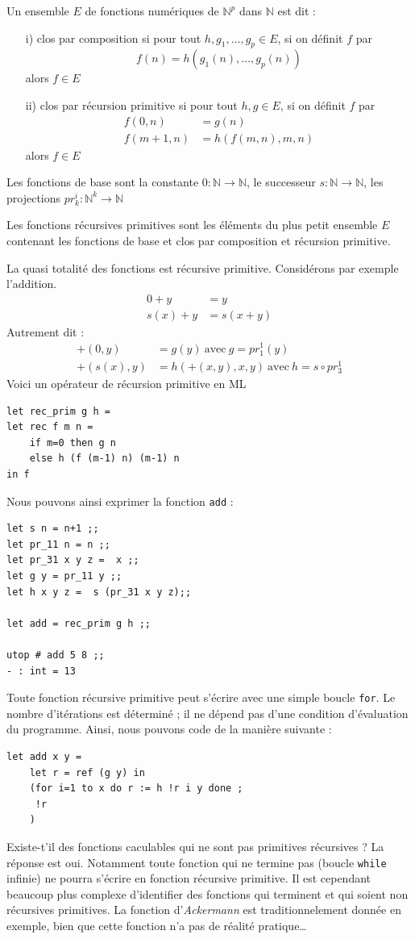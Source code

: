 \documentclass[11pt]{book}
\begin{document}
Un ensemble $E$ de fonctions numériques de $\mathbb{N}^p$ dans $\mathbb{N}$ est dit :
\begin{itemize}
	\item [i)] clos par composition si pour tout $h, g_1, \dots,g_p \in E$, si on définit $f$ par
	 $$f(n)=h(g_1(n), \dots, g_p(n))$$
	alors $f \in E$
	\item [ii)] clos par récursion primitive si pour tout $h,g \in E$, si on définit $f$ par
	\begin{align*}
	f(0,n) &= g(n) \\
	f(m+1, n) &= h(f(m,n),m,n)
\end{align*}
alors $f \in E$
\end{itemize}
Les fonctions de base sont la constante $0 : \mathbb{N} \rightarrow \mathbb{N}$, le successeur 
$s :\mathbb{N} \rightarrow \mathbb{N}$, les projections $pr_k^i : \mathbb{N}^k \rightarrow \mathbb{N}$

Les fonctions récursives primitives sont les éléments du plus petit ensemble $E$ contenant les
fonctions de base et clos par composition et récursion primitive.

La quasi totalité des fonctions est récursive primitive. Considérons par exemple l'addition.
\begin{align*}
	0 + y &= y  \\
	s(x) + y &= s(x+y) 
\end{align*}
Autrement dit :
\begin{align*}
	+ (0, y) &=  g(y)\ \text{avec}\ g=pr_1^1 (y) \\
	+ (s(x), y) &= h (+(x, y), x, y)\ \text{avec}\ h=s \circ  pr_3^1
\end{align*}
Voici un opérateur de récursion primitive en ML
\begin{Verbatim}
let rec_prim g h = 
let rec f m n = 
	if m=0 then g n 
	else h (f (m-1) n) (m-1) n
in f 
\end{Verbatim}
Nous pouvons ainsi exprimer la fonction \verb+add+ :
\begin{Verbatim}
let s n = n+1 ;;
let pr_11 n = n ;;
let pr_31 x y z =  x ;;
let g y = pr_11 y ;;
let h x y z =  s (pr_31 x y z);;

let add = rec_prim g h ;;

utop # add 5 8 ;;
- : int = 13
\end{Verbatim}
Toute fonction récursive primitive peut s'écrire avec une simple boucle \verb+for+.
Le nombre d'itérations est déterminé ; il ne dépend pas d'une condition d'évaluation du programme.
Ainsi, nous pouvons code de la manière suivante :
\begin{Verbatim}
let add x y =
	let r = ref (g y) in
	(for i=1 to x do r := h !r i y done ; 
	 !r
	)
\end{Verbatim}
Existe-t'il des fonctions caculables qui ne sont pas primitives récursives ?
La réponse est oui. Notamment toute fonction qui ne termine pas (boucle \verb+while+ infinie)
ne pourra s'écrire en fonction récursive primitive.
Il est cependant beaucoup plus complexe d'identifier des fonctions qui terminent et qui soient non récursives primitives.
La fonction d'\textit{Ackermann} est traditionnelement donnée en exemple, bien que cette fonction n'a pas
de réalité pratique\dots
\end{document}
